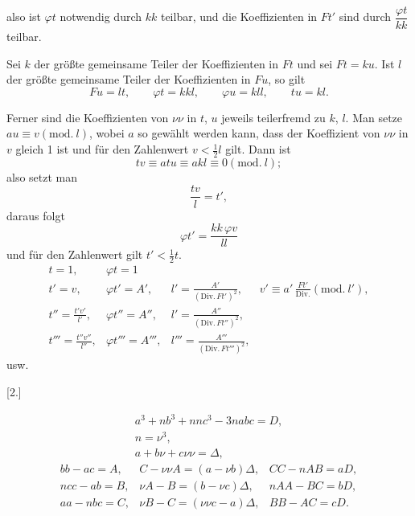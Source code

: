 \noindent also ist $\varphi t$ notwendig durch $kk$ teilbar, und die Koeffizienten in $Ft'$ sind durch
$\dfrac{\varphi t}{kk}$ teilbar.

Sei $k$ der größte gemeinsame Teiler der Koeffizienten in $Ft$ und sei $Ft = ku$. Ist
$l$ der größte gemeinsame Teiler der Koeffizienten in $Fu$, so gilt
\[
Fu = lt, \qquad \varphi t = kkl, \qquad \varphi u = kll, \qquad tu = kl.
\]

Ferner sind die Koeffizienten von $\nu\nu$ in $t$, $u$ jeweils teilerfremd zu $k$, $l$.
Man setze $au \equiv v (\mathrm{mod.}\ l)$, wobei $a$ so gewählt werden kann, dass der Koeffizient von $\nu\nu$
in $v$ gleich 1 ist und für den Zahlenwert $v < \tfrac{1}{2} l$ gilt. Dann ist
\[
tv \equiv atu \equiv akl \equiv 0 (\mathrm{mod.}\ l);
\]
\noindent also setzt man
\[
\frac{tv}{l} = t',
\]
\noindent daraus folgt
\[
\varphi t' = \frac{kk\,\varphi v}{ll}
\]
\noindent und für den Zahlenwert gilt $t' < \tfrac{1}{2} t$.
\begingroup\small
\[
\begin{array}{llll}
t=1,& \varphi t = 1 & & \\
t'=v,& \varphi t' = A', & l' = \frac{A'}{(\mathrm{Div.}\,Ft')^2}, &
v' \equiv a'\,\frac{Ft'}{\mathrm{Div.}} (\mathrm{mod.}\ l'), \\
t''=\frac{t'v'}{l'}, & \varphi t'' = A'', & l' = \frac{A''}{(\mathrm{Div.}\,Ft'')^2}, & \\
t'''=\frac{t''v''}{l''}, & \varphi t''' = A''', & l''' = \frac{A'''}{(\mathrm{Div.}\,Ft''')^2}, &
\end{array}
\]
\endgroup
usw.

\begin{center}[2.]\end{center}
\[
\begin{gathered}
a^3+nb^3+nnc^3-3nabc = D, \\
n = \nu^3, \\
a+b\nu+c\nu\nu = \Delta,
\end{gathered}
\]
\[
\begin{array}{lll}
bb-ac = A, & C-\nu\nu A = (a-\nu b)\Delta, & CC-nAB = aD, \\
ncc-ab = B, & \nu A - B = (b-\nu c)\Delta, & nAA-BC = bD, \\
aa-nbc = C, & \nu B - C = (\nu\nu c - a)\Delta, & BB-AC = cD.
\end{array}
\]

